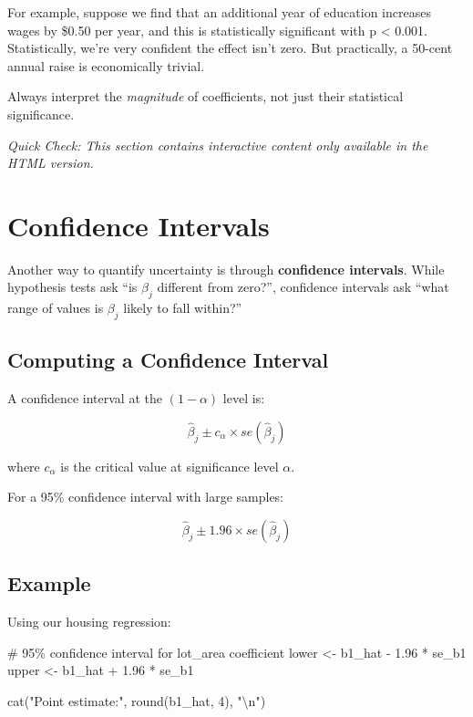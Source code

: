 \documentclass[
  letterpaper,
  DIV=11,
  numbers=noendperiod]{scrreprt}
\newenvironment{Shaded}{\begin{snugshade}}{\end{snugshade}}
\newcommand{\CommentTok}[1]{\textcolor[rgb]{0.37,0.37,0.37}{#1}}
\newcommand{\DecValTok}[1]{\textcolor[rgb]{0.68,0.00,0.00}{#1}}
\newcommand{\FloatTok}[1]{\textcolor[rgb]{0.68,0.00,0.00}{#1}}
\newcommand{\FunctionTok}[1]{\textcolor[rgb]{0.28,0.35,0.67}{#1}}
\newcommand{\NormalTok}[1]{\textcolor[rgb]{0.00,0.23,0.31}{#1}}
\newcommand{\OtherTok}[1]{\textcolor[rgb]{0.00,0.23,0.31}{#1}}
\newcommand{\SpecialCharTok}[1]{\textcolor[rgb]{0.37,0.37,0.37}{#1}}
\newcommand{\StringTok}[1]{\textcolor[rgb]{0.13,0.47,0.30}{#1}}
\begin{document}
For example, suppose we find that an additional year of education
increases wages by \$0.50 per year, and this is statistically
significant with p \textless{} 0.001. Statistically, we're very
confident the effect isn't zero. But practically, a 50-cent annual raise
is economically trivial.

Always interpret the \emph{magnitude} of coefficients, not just their
statistical significance.

\emph{Quick Check: This section contains interactive content only
available in the HTML version.}

\section{Confidence Intervals}\label{confidence-intervals}

Another way to quantify uncertainty is through \textbf{confidence
intervals}. While hypothesis tests ask ``is \(\beta_j\) different from
zero?'', confidence intervals ask ``what range of values is \(\beta_j\)
likely to fall within?''

\subsection{Computing a Confidence
Interval}\label{computing-a-confidence-interval}

A confidence interval at the \((1 - \alpha)\) level is:

\[\hat{\beta}_j \pm c_{\alpha} \times se(\hat{\beta}_j)\]

where \(c_{\alpha}\) is the critical value at significance level
\(\alpha\).

For a 95\% confidence interval with large samples:

\[\hat{\beta}_j \pm 1.96 \times se(\hat{\beta}_j)\]

\subsection{Example}\label{example}

Using our housing regression:

\begin{Shaded}
\begin{Highlighting}[]
\CommentTok{\# 95\% confidence interval for lot\_area coefficient}
\NormalTok{lower }\OtherTok{\textless{}{-}}\NormalTok{ b1\_hat }\SpecialCharTok{{-}} \FloatTok{1.96} \SpecialCharTok{*}\NormalTok{ se\_b1}
\NormalTok{upper }\OtherTok{\textless{}{-}}\NormalTok{ b1\_hat }\SpecialCharTok{+} \FloatTok{1.96} \SpecialCharTok{*}\NormalTok{ se\_b1}

\FunctionTok{cat}\NormalTok{(}\StringTok{"Point estimate:"}\NormalTok{, }\FunctionTok{round}\NormalTok{(b1\_hat, }\DecValTok{4}\NormalTok{), }\StringTok{"}\SpecialCharTok{\textbackslash{}n}\StringTok{"}\NormalTok{)}
\end{Highlighting}
\end{Shaded}
\end{document}

